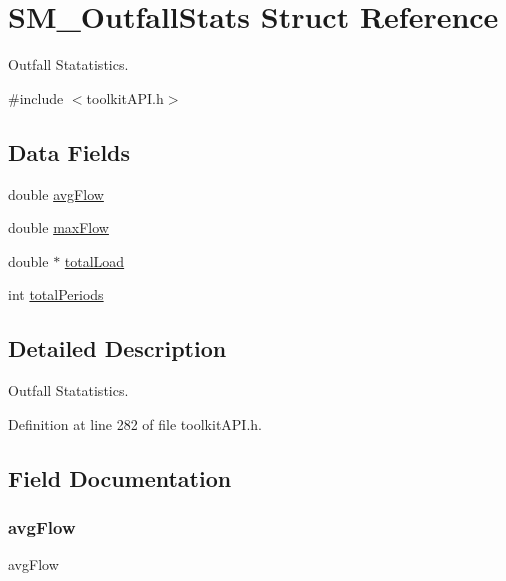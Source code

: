 \hypertarget{struct_s_m___outfall_stats}{}\section{S\+M\+\_\+\+Outfall\+Stats Struct Reference}
\label{struct_s_m___outfall_stats}


Outfall Statatistics.  




{\ttfamily \#include $<$toolkit\+A\+P\+I.\+h$>$}

\subsection*{Data Fields}
\begin{DoxyCompactItemize}
\item 
double \hyperlink{struct_s_m___outfall_stats_afcd256ffd7ec0ed557f6dc62d9b83a52}{avg\+Flow}
\item 
double \hyperlink{struct_s_m___outfall_stats_a4d84bca5454f3903c44fe865e44674f5}{max\+Flow}
\item 
double $\ast$ \hyperlink{struct_s_m___outfall_stats_a07bf14d41a8a678b2cad797d53f84fa8}{total\+Load}
\item 
int \hyperlink{struct_s_m___outfall_stats_a60fffeca33e0487e4b7cac3898b2cf05}{total\+Periods}
\end{DoxyCompactItemize}


\subsection{Detailed Description}
Outfall Statatistics. 

Definition at line 282 of file toolkit\+A\+P\+I.\+h.



\subsection{Field Documentation}
\mbox{\label{struct_s_m___outfall_stats_afcd256ffd7ec0ed557f6dc62d9b83a52}} 
\subsubsection{\texorpdfstring{avg\+Flow}{avgFlow}}
{\footnotesize\ttfamily avg\+Flow}

